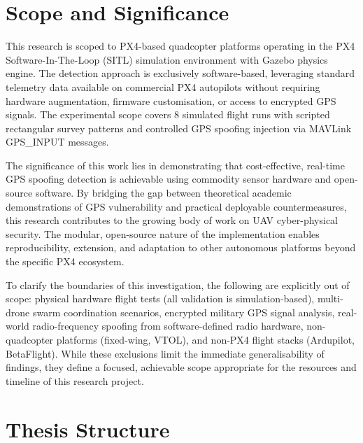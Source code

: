 \section{Scope and Significance}

This research is scoped to PX4-based quadcopter platforms operating in the PX4 Software-In-The-Loop (SITL) simulation environment with Gazebo physics engine. The detection approach is exclusively software-based, leveraging standard telemetry data available on commercial PX4 autopilots without requiring hardware augmentation, firmware customisation, or access to encrypted GPS signals. The experimental scope covers 8 simulated flight runs with scripted rectangular survey patterns and controlled GPS spoofing injection via MAVLink GPS\_INPUT messages.

The significance of this work lies in demonstrating that cost-effective, real-time GPS spoofing detection is achievable using commodity sensor hardware and open-source software. By bridging the gap between theoretical academic demonstrations of GPS vulnerability and practical deployable countermeasures, this research contributes to the growing body of work on UAV cyber-physical security. The modular, open-source nature of the implementation enables reproducibility, extension, and adaptation to other autonomous platforms beyond the specific PX4 ecosystem.

To clarify the boundaries of this investigation, the following are explicitly out of scope: physical hardware flight tests (all validation is simulation-based), multi-drone swarm coordination scenarios, encrypted military GPS signal analysis, real-world radio-frequency spoofing from software-defined radio hardware, non-quadcopter platforms (fixed-wing, VTOL), and non-PX4 flight stacks (Ardupilot, BetaFlight). While these exclusions limit the immediate generalisability of findings, they define a focused, achievable scope appropriate for the resources and timeline of this research project.

\section{Thesis Structure}

